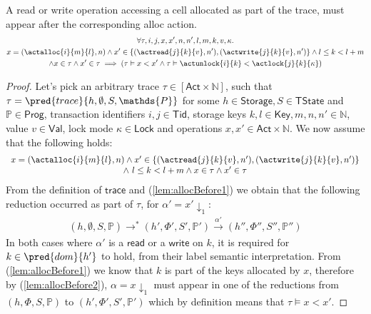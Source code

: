 \begin{lem}
	\label{lem:allocBefore}
	A read or write operation accessing a cell allocated as part of the trace, must appear after the corresponding alloc action.
	\begin{gather*}
		\forall \tau, i, j, x, x', n, n', l, m, k, v, \kappa \ldotp \\
		x = (\actalloc{i}{m}{l}, n) \land x' \in \{ (\actread{j}{k}{v}, n'), (\actwrite{j}{k}{v}, n') \} \land l \leq k < l + m
		\\
		\land x \in \tau \land x' \in \tau
		\implies
		\left( \tau \vDash x < x'  \land \tau \vDash \actunlock{i}{k} < \actlock{j}{k}{\kappa} \right)
	\end{gather*}
	\begin{proof}
	Let's pick an arbitrary trace $\tau \in [\mathsf{Act} \times \mathds{N}]$, such that $\tau = \pred{trace}{h, \emptyset, S, \mathds{P}}$ for some $h \in \mathsf{Storage}, S \in \mathsf{TState}$ and $\mathds{P} \in \mathsf{Prog}$, transaction identifiers $i, j \in \mathsf{Tid}$, storage keys $k, l \in \mathsf{Key}, m, n, n' \in \mathds{N}$, value $v \in \mathsf{Val}$, lock mode $\kappa \in \mathsf{Lock}$ and operations $x, x' \in \mathsf{Act} \times \mathds{N}$. We now assume that the following holds:
	\begin{gather}
		\label{lem:allocBefore1}
		\begin{array}{c}
			x = (\actalloc{i}{m}{l}, n) \land x' \in \{ (\actread{j}{k}{v}, n'), (\actwrite{j}{k}{v}, n') \}
			\\
			\land\ l \leq k < l + m
			\land x \in \tau \land x' \in \tau
		\end{array}
	\end{gather}
	From the definition of $\mathsf{trace}$ and (\ref{lem:allocBefore1}) we obtain that the following reduction occurred as part of $\tau$, for $\alpha' = x' \downarrow_1$:
	\begin{gather}
		\label{lem:allocBefore2}	
		(h, \emptyset, S, \mathds{P}) \rightarrow^* (h', \Phi', S', \mathds{P}') \xrightarrow{\alpha'} (h'', \Phi'', S'', \mathds{P}'')
	\end{gather}
	In both cases where $\alpha'$ is a $\mathsf{read}$ or a $\mathsf{write}$ on $k$, it is required for $k \in \pred{dom}{h'}$ to hold, from their label semantic interpretation. From (\ref{lem:allocBefore1}) we know that $k$ is part of the keys allocated by $x$, therefore by (\ref{lem:allocBefore2}), $\alpha = x \downarrow_1$ must appear in one of the reductions from $(h, \Phi, S, \mathds{P})$ to $(h', \Phi', S', \mathds{P}')$ which by definition means that $\tau \vDash x < x'$.
	

\end{proof}
\end{lem}
